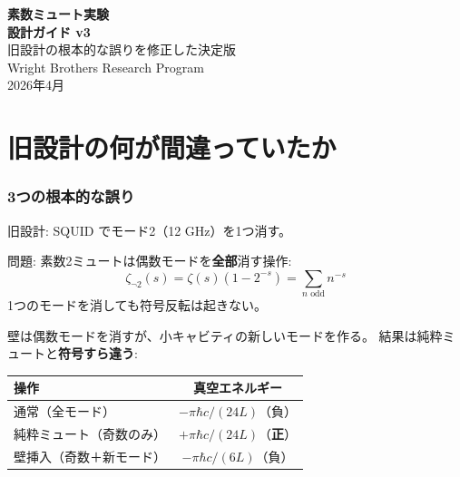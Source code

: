 \documentclass[12pt,a4paper]{article}
\begin{document}
\begin{center}
{\Huge\bfseries 素数ミュート実験}\\[0.3cm]
{\Huge\bfseries 設計ガイド v3}\\[0.8cm]
{\Large 旧設計の根本的な誤りを修正した決定版}\\[1cm]
{\large Wright Brothers Research Program}\\[0.3cm]
{2026年4月}
\end{center}

\vspace{0.5cm}
\tableofcontents
\newpage

\part{旧設計の何が間違っていたか}

\section{3つの根本的な誤り}

\begin{dangerbox}
旧設計: SQUID でモード2（12 GHz）を1つ消す。

問題: 素数2ミュートは偶数モードを\textbf{全部}消す操作:
$$\zeta_{\neg 2}(s) = \zeta(s)(1-2^{-s}) = \sum_{n \text{ odd}} n^{-s}$$
1つのモードを消しても符号反転は起きない。
\end{dangerbox}

\begin{dangerbox}
壁は偶数モードを消すが、小キャビティの新しいモードを作る。
結果は純粋ミュートと\textbf{符号すら違う}:
\begin{center}
\begin{tabular}{lc}
\toprule
操作 & 真空エネルギー \\
\midrule
通常（全モード） & $-\pi\hbar c/(24L)$（負） \\
純粋ミュート（奇数のみ） & $+\pi\hbar c/(24L)$（\textbf{正}） \\
壁挿入（奇数＋新モード） & $-\pi\hbar c/(6L)$（負） \\
\bottomrule
\end{tabular}
\end{center}
\end{dangerbox}
\end{document}
